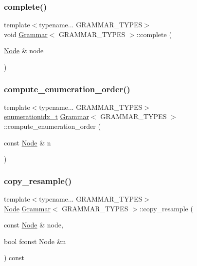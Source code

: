 \subsubsection{\texorpdfstring{complete()}{complete()}}
{\footnotesize\ttfamily template$<$typename... G\+R\+A\+M\+M\+A\+R\+\_\+\+T\+Y\+P\+ES$>$ \\
void \hyperlink{class_grammar}{Grammar}$<$ G\+R\+A\+M\+M\+A\+R\+\_\+\+T\+Y\+P\+ES $>$\+::complete (\begin{DoxyParamCaption}\item[{\hyperlink{class_node}{Node} \&}]{node }\end{DoxyParamCaption})\hspace{0.3cm}{\ttfamily [inline]}}

\mbox{\label{class_grammar_a37b475b665c37057084d9244abcf25f9}} 
\subsubsection{\texorpdfstring{compute\+\_\+enumeration\+\_\+order()}{compute\_enumeration\_order()}}
{\footnotesize\ttfamily template$<$typename... G\+R\+A\+M\+M\+A\+R\+\_\+\+T\+Y\+P\+ES$>$ \\
\hyperlink{_numerics_8h_a9fe2bbca873b046b2bd276fc6856bb88}{enumerationidx\+\_\+t} \hyperlink{class_grammar}{Grammar}$<$ G\+R\+A\+M\+M\+A\+R\+\_\+\+T\+Y\+P\+ES $>$\+::compute\+\_\+enumeration\+\_\+order (\begin{DoxyParamCaption}\item[{const \hyperlink{class_node}{Node} \&}]{n }\end{DoxyParamCaption})\hspace{0.3cm}{\ttfamily [inline]}}

\mbox{\label{class_grammar_a28b35de7e71ac8f451cd3a65818fc1db}} 
\subsubsection{\texorpdfstring{copy\+\_\+resample()}{copy\_resample()}}
{\footnotesize\ttfamily template$<$typename... G\+R\+A\+M\+M\+A\+R\+\_\+\+T\+Y\+P\+ES$>$ \\
\hyperlink{class_node}{Node} \hyperlink{class_grammar}{Grammar}$<$ G\+R\+A\+M\+M\+A\+R\+\_\+\+T\+Y\+P\+ES $>$\+::copy\+\_\+resample (\begin{DoxyParamCaption}\item[{const \hyperlink{class_node}{Node} \&}]{node,  }\item[{bool }]{fconst Node \&n }\end{DoxyParamCaption}) const\hspace{0.3cm}{\ttfamily [inline]}}

